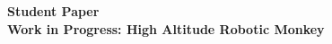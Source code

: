 \begin{center}

    \vspace*{-2cm} %
    {\fontsize{14pt}{17pt}\selectfont\bfseries Student Paper} \\
    {\fontsize{14pt}{17pt}\selectfont\bfseries Work in Progress: High Altitude Robotic Monkey} \\

\end{center}